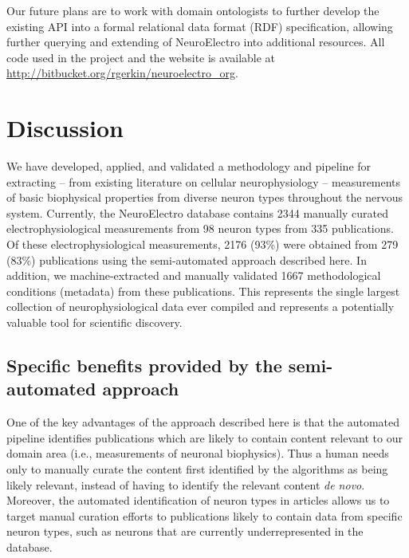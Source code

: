 \documentclass{template/frontiersSCNS} %
\begin{document}
Our future plans are to work with domain ontologists to further develop the existing API into a formal relational data format (RDF) specification, allowing further querying and extending of NeuroElectro into additional resources. All code used in the project and the website is available at \url{http://bitbucket.org/rgerkin/neuroelectro_org}.  

\section{Discussion}

We have developed, applied, and validated a methodology and pipeline for extracting -- from existing literature on cellular neurophysiology -- measurements of basic biophysical properties from diverse neuron types throughout the nervous system.  
Currently, the NeuroElectro database contains 2344 manually curated electrophysiological measurements from 98 neuron types from 335 publications.  
Of these electrophysiological measurements, 2176 (93\%) were obtained from 279 (83\%) publications using the semi-automated approach described here.  
In addition, we machine-extracted and manually validated 1667 methodological conditions (metadata) from these publications.  
This represents the single largest collection of neurophysiological data ever compiled and represents a potentially valuable tool for scientific discovery.

\subsection{Specific benefits provided by the semi-automated approach}
One of the key advantages of the approach described here is that the automated pipeline identifies publications which are likely to contain content relevant to our domain area (i.e., measurements of neuronal biophysics).  
Thus a human needs only to manually curate the content first identified by the algorithms as being likely relevant, instead of having to identify the relevant content \emph{de novo}.  
Moreover, the automated identification of neuron types in articles allows us to target manual curation efforts to publications likely to contain data from specific neuron types, such as neurons that are currently underrepresented in the database.
\end{document}
